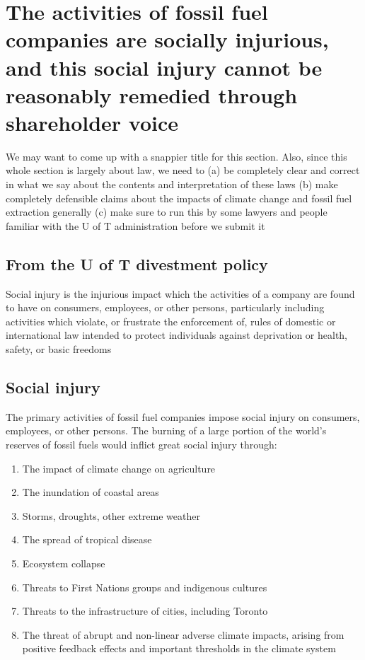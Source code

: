
		\section{The activities of fossil fuel companies are socially injurious, and this social injury cannot be reasonably remedied through shareholder voice}

\begin{vcom}		
We may want to come up with a snappier title for this section. Also, since this whole section is largely about law, we need to (a) be completely clear and correct in what we say about the contents and interpretation of these laws (b) make completely defensible claims about the impacts of climate change and fossil fuel extraction generally (c) make sure to run this by some lawyers and people familiar with the U of T administration before we submit it
\end{vcom}

	\subsection{From the U of T divestment policy}

\begin{itquote}
Social injury is the injurious impact which the activities of a company are found to have on consumers, employees, or other persons, particularly including activities which violate, or frustrate the enforcement of, rules of domestic or international law intended to protect individuals against deprivation or health, safety, or basic freedoms
\end{itquote}



	\subsection{Social injury}


The primary activities of fossil fuel companies impose social injury on consumers, employees, or other persons.
The burning of a large portion of the world's reserves of fossil fuels would inflict great social injury through:
\begin{enumerate}
\item The impact of climate change on agriculture
\item The inundation of coastal areas
\item Storms, droughts, other extreme weather
\item The spread of tropical disease
\item Ecosystem collapse 
\item Threats to First Nations groups and indigenous cultures
\item Threats to the infrastructure of cities, including Toronto
\item The threat of abrupt and non-linear adverse climate impacts, arising from positive feedback effects and important thresholds in the climate system
\end{enumerate}

